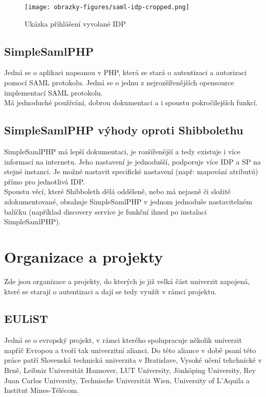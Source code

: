 \begin{figure}[bp]
	\centering
    \texttt{[image: obrazky-figures/saml-idp-cropped.png]}
	\caption{Ukázka přihlášení vyvolané IDP\cite{SAMLxOIDC}}
	\label{saml-flow-idp}
\end{figure}


\section{SimpleSamlPHP} %

Jedná se o aplikaci napsanou v PHP, která se stará o autentizaci a autorizaci pomocí SAML protokolu. Jedná se o jednu z nejrozšířenějších opensource implementací SAML protokolu.\\

Má jednoduché používání, dobrou dokumentaci a i spoustu pokročilejších funkcí.\cite{simplesamlphpdoc}

\section{SimpleSamlPHP výhody oproti Shibbolethu} %

SimpleSamlPHP má lepší dokumentaci, je rozšířenější a tedy existuje i více informací na internetu. Jeho nastavení je jednodušší, podporuje více IDP a SP na stejné instanci. Je možné nastavit specifické nastavení (např: mapování atributů) přímo pro jednotlivá IDP.\\ 
Spoustu věcí, které Shibboleth dělá odděleně, nebo má nejasně či složitě zdokumentované, obsahuje SimpleSamlPHP v jednom jednoduše nastavitelném balíčku (například discovery service je funkční ihned po instalaci SimpleSamlPHP). 

\chapter{Organizace a projekty} %

Zde jsou organizace a projekty, do kterých je již velká část univerzit zapojená, které se starají o autentizaci a dají se tedy využít v rámci projektu.

\section{EULiST} %
Jedná se o evropský projekt, v rámci kterého spolupracuje několik univerzit napříč Evropou a tvoří tak univerzitní alianci. Do této aliance v době psaní této práce patří Slovenská technická univerzita v Bratislave, Vysoké učení tehchnické v Brně,  Leibniz Universität Hannover, LUT University, Jönköping University, Rey Juan Carlos University, Technische Universität Wien, University of L’Aquila a Institut Mines-Télécom.\cite{eulist}

